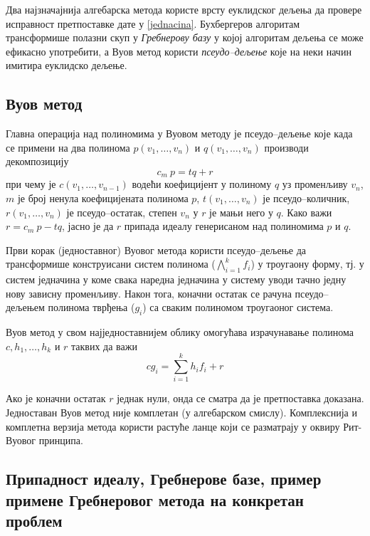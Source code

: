 Два најзначајнија алгебарска метода користе врсту еуклидског дељења да
провере исправност претпоставке дате у \ref{jednacina}. Бухбергеров
алгоритам трансформише полазни скуп у \emph{Гребнерову базу} у којој
алгоритам дељења се може ефикасно употребити, а Вуов метод користи
\emph{псеудо--дељење} које на неки начин имитира еуклидско дељење.

\subsection{Вуов метод}

Главна операција над полиномима у Вуовом методу је псеудо--дељење које
када се примени на два полинома $p(v_1, \ldots, v_n)$ и $q(v_1,
\ldots, v_n)$ производи декомпозицију
$$c_m\ p = tq + r$$ при чему је $c(v_1 ,\ldots , v_{n-1})$ водећи
коефицијент у полиному $q$ уз променљиву $v_n$, $m$ је број ненула
коефицијената полинома $p$, $t(v_1, \ldots, v_n)$ је псеудо--количник,
$r(v_1, \ldots, v_n)$ је псеудо--остатак, степен $v_n$ у $r$ је мањи
него у $q$. Како важи $r = c_m\ p - tq$, јасно је да $r$ припада
идеалу генерисаном над полиномима $p$ и $q$. 

Први корак (једноставног) Вуовог метода \cite{chou1988mechanical}
користи псеудо--дељење да трансформише конструисани систем полинома
($\bigwedge_{i=1}^k f_i$) у троугаону форму, тј. у систем једначина у
коме свака наредна једначина у систему уводи тачно једну нову зависну
променљиву. Након тога, коначни остатак се рачуна псеудо--дељењем
полинома тврђења ($g_i$) са сваким полиномом троугаоног система.

Вуов метод у свом најједноставнијем облику омогућава израчунавање
полинома $c, h_1, \ldots, h_k$ и $r$ таквих да важи
$$cg_i = \sum_{i=1}^k h_if_i + r$$

Ако је коначни остатак $r$ једнак нули, онда се сматра да је
претпоставка доказана. Једноставан Вуов метод није комплетан (у
алгебарском смислу). Комплекснија и комплетна верзија метода користи
растуће ланце који се разматрају у оквиру Рит-Вуовог принципа.

\subsection{Припадност идеалу, Гребнерове базе, пример примене Гребнеровог метода на конкретан проблем}

